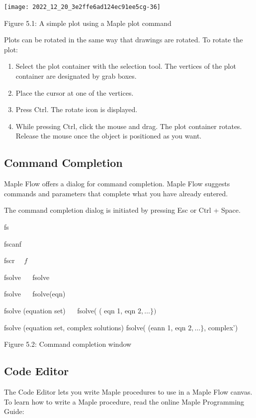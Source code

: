 \begin{center}
\texttt{[image: 2022\_12\_20\_3e2ffe6ad124ec91ee5cg-36]}
\end{center}

Figure 5.1: A simple plot using a Maple plot command

Plots can be rotated in the same way that drawings are rotated. To rotate the plot:

\begin{enumerate}
  \item Select the plot container with the selection tool. The vertices of the plot container are designated by grab boxes.

  \item Place the cursor at one of the vertices.

  \item Press Ctrl. The rotate icon is displayed.

  \item While pressing Ctrl, click the mouse and drag. The plot container rotates. Release the mouse once the object is positioned as you want.

\end{enumerate}

\subsection{Command Completion}
Maple Flow offers a dialog for command completion. Maple Flow suggests commands and parameters that complete what you have already entered.

The command completion dialog is initiated by pressing Esc or Ctrl + Space.

fs

fscanf

fscr $\quad f$

fsolve $\quad$ fsolve

fsolve $\quad$ fsolve(eqn)

fsolve (equation set) $\quad$ fsolve( ( eqn 1, eqn $2, \ldots\})$

fsolve (equation set, complex solutions) fsolve( (eann 1, eqn $2, \ldots\}$, complex')

Figure 5.2: Command completion window

\subsection{Code Editor}
The Code Editor lets you write Maple procedures to use in a Maple Flow canvas. To learn how to write a Maple procedure, read the online Maple Programming Guide:

